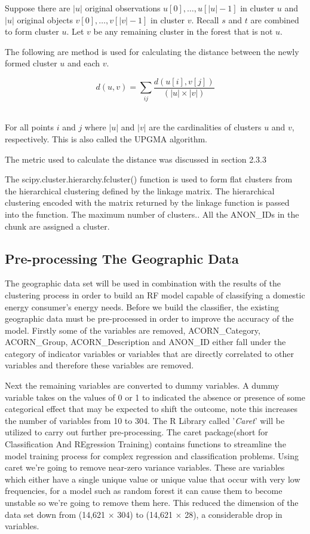     Suppose there are $|u|$ original observations $u[0],\dots, u[|u| -1]$ in cluster $u$ and $|u|$ original objects $v[0], \dots, v[|v| -1]$ in cluster $v$. Recall $s$ and $t$ are combined to form cluster $u$. Let $v$ be any remaining cluster in the forest that is not $u$.
    
    The following are method is used for calculating the distance between the newly formed cluster $u$ and each $v$.
    
    \begin{equation}
d(u, v) = \sum_{ij} \frac{d(u[i], v[j])}{(|u| \times |v|)}
    \end{equation}\
    
    For all points $i$ and $j$ where $|u|$ and $|v|$ are the cardinalities of clusters $u$ and $v$, respectively. This is also called the UPGMA algorithm.
    
    The metric used to calculate the distance was discussed in section 2.3.3
    
    The scipy.cluster.hierarchy.fcluster() function is used to form flat clusters from the hierarchical clustering defined by the linkage matrix. The hierarchical clustering encoded with the matrix returned by the linkage function is passed into the function. The maximum number of clusters..
    All the ANON\_IDs in the chunk are assigned a cluster.
    
    \subsection{Pre-processing The Geographic Data}
    The geographic data set will be used in combination with the results of the clustering process in order to build an RF model capable of classifying a domestic energy consumer's energy needs. Before we build the classifier, the existing geographic data must be pre-processed in order to improve the accuracy of the model.
    Firstly some of the variables are removed, ACORN\_Category, ACORN\_Group, ACORN\_Description and ANON\_ID either fall under the category of indicator variables or variables that are directly correlated to other variables and therefore these variables are removed. 
    
    Next the remaining variables are converted to dummy variables. A dummy variable takes on the values of 0 or 1 to indicated the absence or presence of some categorical effect that may be expected to shift the outcome, note this increases the number of variables from 10 to 304. The R Library called '\textit{Caret}' will be utilized to carry out further pre-processing. The caret package(short for Classification And REgression Training) contains functions to streamline the model training process for complex regression and classification problems. Using caret we're going to remove near-zero variance variables. These are variables which either have a single unique value or unique value that occur with very low frequencies, for a model such as random forest it can cause them to become unstable so we're going to remove them here. This reduced the dimension of the data set down from (14,621 $\times$ 304) to (14,621 $\times$ 28), a considerable drop in variables.
    
